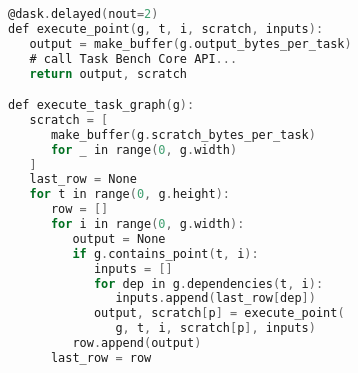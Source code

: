 \begin{lstlisting}[language=C,caption={Excerpt from Task Bench implementation in Dask.},label={lst:code-sample},style=codeblock,float]
@dask.delayed(nout=2)
def execute_point(g, t, i, scratch, inputs):
   output = make_buffer(g.output_bytes_per_task)
   # call Task Bench Core API...
   return output, scratch

def execute_task_graph(g):
   scratch = [
      make_buffer(g.scratch_bytes_per_task)
      for _ in range(0, g.width)
   ]
   last_row = None
   for t in range(0, g.height):
      row = []
      for i in range(0, g.width):
         output = None
         if g.contains_point(t, i):
            inputs = []
            for dep in g.dependencies(t, i):
               inputs.append(last_row[dep])
            output, scratch[p] = execute_point(
               g, t, i, scratch[p], inputs)
         row.append(output)
      last_row = row
\end{lstlisting}
